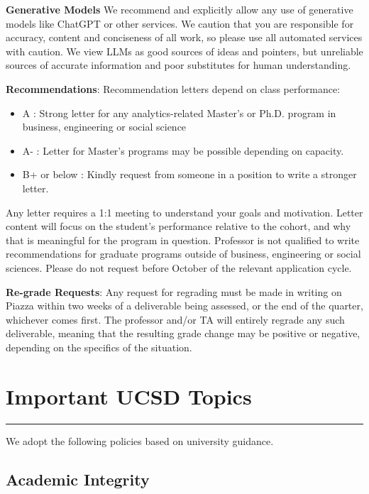 \documentclass[12pt]{article}
\begin{document}
\textbf{Generative Models} We recommend and explicitly allow any use of generative models like ChatGPT or other services. We caution that you are responsible for accuracy, content and conciseness of all work, so please use all automated services with caution. We view LLMs as good sources of ideas and pointers, but unreliable sources of accurate information and poor substitutes for human understanding.


\textbf{Recommendations}: Recommendation letters depend on class performance:
\begin{itemize}
\item A : Strong letter for any analytics-related Master's or Ph.D. program in business, engineering or social science
\item A- : Letter for Master's programs may be possible depending on capacity. 
\item B+ or below : Kindly request from someone in a position to write a stronger letter.
\end{itemize}
Any letter requires a 1:1 meeting to understand your goals and motivation. Letter content will focus on the student's performance relative to the cohort, and why that is meaningful for the program in question. Professor is not qualified to write recommendations for graduate programs outside of business, engineering or social sciences. Please do not request before October of the relevant application cycle.

\textbf{Re-grade Requests}: Any request for regrading must be made in writing on Piazza within two weeks of a deliverable being assessed, or the end of the quarter, whichever comes first. The professor and/or TA will entirely regrade any such deliverable, meaning that the resulting grade change may be positive or negative, depending on the specifics of the situation. 

\bigskip

\section*{Important UCSD Topics}

\medskip
\hrule
\medskip

\vspace{0.5cm}


We adopt the following policies based on university guidance.

\subsection*{Academic Integrity}
\end{document}
